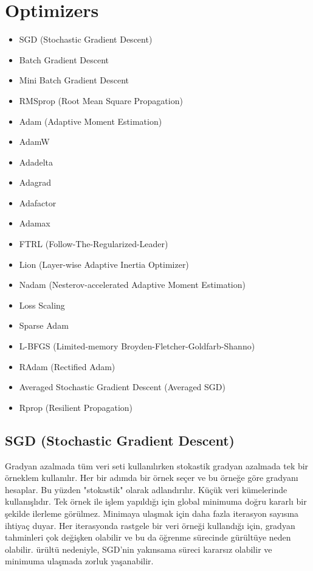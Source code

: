 \section{Optimizers}

\begin{itemize}
	\item SGD (Stochastic Gradient Descent)
	\item Batch Gradient Descent
	\item Mini Batch Gradient Descent
	\item RMSprop (Root Mean Square Propagation)
	\item Adam (Adaptive Moment Estimation)
	\item AdamW
	\item Adadelta
	\item Adagrad
	\item Adafactor
	\item Adamax
	\item FTRL (Follow-The-Regularized-Leader)
	\item Lion (Layer-wise Adaptive Inertia Optimizer)
	\item Nadam (Nesterov-accelerated Adaptive Moment Estimation)
	\item Loss Scaling
	\item Sparse Adam
	\item L-BFGS (Limited-memory Broyden-Fletcher-Goldfarb-Shanno)
	\item RAdam (Rectified Adam)
	\item Averaged Stochastic Gradient Descent (Averaged SGD)
	\item Rprop (Resilient Propagation)
\end{itemize}

\newpage

\subsection{SGD (Stochastic Gradient Descent)}
Gradyan azalmada tüm veri seti kullanılırken stokastik gradyan azalmada tek bir örneklem kullanılır. Her bir adımda bir örnek seçer ve bu örneğe göre gradyanı hesaplar. Bu yüzden "stokastik" olarak adlandırılır. Küçük veri kümelerinde kullanışlıdır. Tek örnek ile işlem yapıldığı için global minimuma doğru kararlı bir şekilde ilerleme görülmez. Minimaya ulaşmak için daha fazla iterasyon sayısına ihtiyaç duyar. Her iterasyonda rastgele bir veri örneği kullandığı için, gradyan tahminleri çok değişken olabilir ve bu da öğrenme sürecinde gürültüye neden olabilir. ürültü nedeniyle, SGD'nin yakınsama süreci kararsız olabilir ve minimuma ulaşmada zorluk yaşanabilir.

